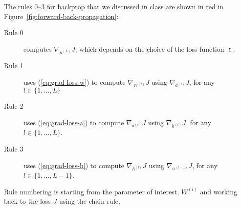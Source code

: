 \documentclass{article}
\begin{document}
The rules 0--3 for backprop that we discussed in class are shown in
red in Figure~\ref{fig:forward-back-propagation}:
\begin{description}
\item[Rule 0] computes $\nabla_{h^{(L)}} J$, which depends on the
  choice of the loss function $\ell$.
\item[Rule 1] uses (\ref{eq:grad-loss-w}) to compute
  $\nabla_{W^{(l)}} J$ using $\nabla_{a^{(l)}} J$, for any $l\in\{1,\dots,L\}$
\item[Rule 2] uses (\ref{eq:grad-loss-a}) to compute
  $\nabla_{a^{(l)}} J$ using $\nabla_{h^{(l)}} J$, for any $l\in\{1,\dots,L\}$.
\item[Rule 3] uses (\ref{eq:grad-loss-h}) to compute
  $\nabla_{h^{(l)}} J$ using $\nabla_{a^{(l+1)}} J$, for any $l\in\{1,\dots,L-1\}$.
\end{description}
Rule numbering is starting from the parameter of interest, $W^{(l)}$
and working back to the loss $J$ using the chain rule.
\end{document}
